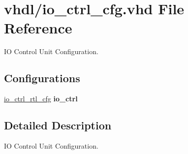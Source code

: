 \hypertarget{io__ctrl__cfg_8vhd}{}\section{vhdl/io\+\_\+ctrl\+\_\+cfg.vhd File Reference}
\label{io__ctrl__cfg_8vhd}


IO Control Unit Configuration.  


\subsection*{Configurations}
 \begin{DoxyCompactItemize}
\item 
\mbox{\label{io__ctrl__cfg_8vhd_ad4882792e0623e919c5c75e031efa056}} 
\hyperlink{io__ctrl__cfg_8vhd_ad4882792e0623e919c5c75e031efa056}{io\+\_\+ctrl\+\_\+rtl\+\_\+cfg}  {\bfseries io\+\_\+ctrl}   
\end{DoxyCompactItemize}


\subsection{Detailed Description}
IO Control Unit Configuration. 

